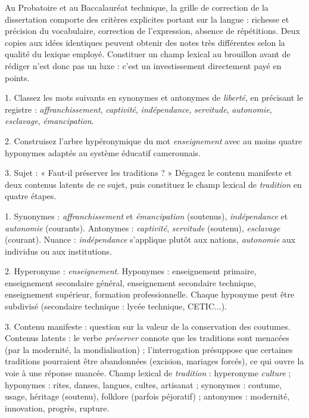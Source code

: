 \documentclass[11pt]{article}
\begin{document}
\begin{savaistu}
Au Probatoire et au Baccalauréat technique, la grille de correction de la dissertation comporte des critères explicites portant sur la langue : richesse et précision du vocabulaire, correction de l'expression, absence de répétitions. Deux copies aux idées identiques peuvent obtenir des notes très différentes selon la qualité du lexique employé. Constituer un champ lexical au brouillon avant de rédiger n'est donc pas un luxe : c'est un investissement directement payé en points.
\end{savaistu}

\begin{exercice}[Entraînement]
1. Classez les mots suivants en synonymes et antonymes de \emph{liberté}, en précisant le registre : \emph{affranchissement}, \emph{captivité}, \emph{indépendance}, \emph{servitude}, \emph{autonomie}, \emph{esclavage}, \emph{émancipation}.

2. Construisez l'arbre hypéronymique du mot \emph{enseignement} avec au moins quatre hyponymes adaptés au système éducatif camerounais.

3. Sujet : « Faut-il préserver les traditions ? » Dégagez le contenu manifeste et deux contenus latents de ce sujet, puis constituez le champ lexical de \emph{tradition} en quatre étapes.
\end{exercice}

\begin{corrige}[Exercice]
1. Synonymes : \emph{affranchissement} et \emph{émancipation} (soutenus), \emph{indépendance} et \emph{autonomie} (courants). Antonymes : \emph{captivité}, \emph{servitude} (soutenu), \emph{esclavage} (courant). Nuance : \emph{indépendance} s'applique plutôt aux nations, \emph{autonomie} aux individus ou aux institutions.

2. Hyperonyme : \emph{enseignement}. Hyponymes : enseignement primaire, enseignement secondaire général, enseignement secondaire technique, enseignement supérieur, formation professionnelle. Chaque hyponyme peut être subdivisé (secondaire technique : lycée technique, CETIC...).

3. Contenu manifeste : question sur la valeur de la conservation des coutumes. Contenus latents : le verbe \emph{préserver} connote que les traditions sont menacées (par la modernité, la mondialisation) ; l'interrogation présuppose que certaines traditions pourraient être abandonnées (excision, mariages forcés), ce qui ouvre la voie à une réponse nuancée. Champ lexical de \emph{tradition} : hyperonyme \emph{culture} ; hyponymes : rites, danses, langues, cultes, artisanat ; synonymes : coutume, usage, héritage (soutenu), folklore (parfois péjoratif) ; antonymes : modernité, innovation, progrès, rupture.
\end{corrige}
\end{document}
